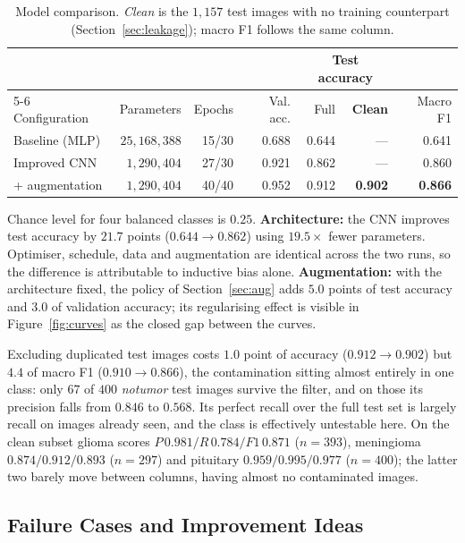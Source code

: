 \documentclass[10pt,a4paper]{article}
\begin{document}
\begin{table}[tbp]
\centering
\small
\caption{Model comparison. \emph{Clean} is the $1{,}157$ test images with no
training counterpart (Section~\ref{sec:leakage}); macro F1 follows the same
column.}
\label{tab:results}
\begin{tabular}{lrrrrrr}
\toprule
& & & & \multicolumn{2}{c}{Test accuracy} & \\
\cmidrule(lr){5-6}
Configuration & Parameters & Epochs & Val. acc. & Full & \textbf{Clean} & Macro F1 \\
\midrule
Baseline (MLP)       & $25{,}168{,}388$ & 15/30 & 0.688 & 0.644 & --- & 0.641 \\
Improved CNN         & $1{,}290{,}404$  & 27/30 & 0.921 & 0.862 & --- & 0.860 \\
\quad + augmentation & $1{,}290{,}404$  & 40/40 & 0.952 & 0.912 & \textbf{0.902} & \textbf{0.866} \\
\bottomrule
\end{tabular}
\end{table}

Chance level for four balanced classes is $0.25$. \textbf{Architecture:} the CNN
improves test accuracy by $21.7$ points ($0.644 \rightarrow 0.862$) using
$19.5\times$ fewer parameters. Optimiser, schedule, data and augmentation are
identical across the two runs, so the difference is attributable to inductive
bias alone. \textbf{Augmentation:} with the architecture fixed, the policy of
Section~\ref{sec:aug} adds $5.0$ points of test accuracy and $3.0$ of validation
accuracy; its regularising effect is visible in Figure~\ref{fig:curves} as the
closed gap between the curves.

Excluding duplicated test images costs $1.0$ point of accuracy
($0.912 \rightarrow 0.902$) but $4.4$ of macro F1
($0.910 \rightarrow 0.866$), the contamination sitting almost entirely in one
class: only $67$ of $400$ \emph{notumor} test images survive the filter, and on
those its precision falls from $0.846$ to $0.568$. Its perfect recall over the
full test set is largely recall on images already seen, and the class is
effectively untestable here. On the clean subset glioma scores
$P\,0.981 / R\,0.784 / F1\,0.871$ ($n=393$), meningioma
$0.874 / 0.912 / 0.893$ ($n=297$) and pituitary $0.959 / 0.995 / 0.977$
($n=400$); the latter two barely move between columns, having almost no
contaminated images.

\subsection{Failure Cases and Improvement Ideas}
\end{document}
